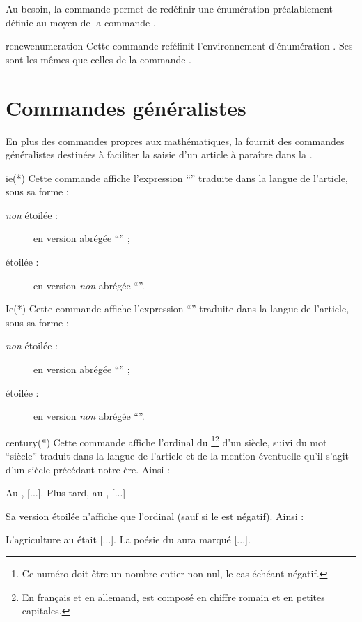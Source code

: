 \documentclass[french,nolocaltoc]{nwejmart}
\newtheorem[style=definition]{fait}
\newtheorem[title=contraventionnalisation]{ctrv}
\newtheorem[title-plural=anneaux]{anneau}
\newtheorem[title-plural=idéaux]{idéal}
\begin{document}
Au besoin, la commande  permet de redéfinir une
énumération préalablement définie au moyen de la commande
.

\begin{docCommand}[doc new=2019-03-18]{renewenumeration}{}
  Cette commande reféfinit l'environnement d'énumération . Ses
   sont les mêmes que celles de la commande
  .
\end{docCommand}

\section{Commandes généralistes}
\label{sec:comm-gener}

En plus des commandes propres aux mathématiques, la \nwejmauthorcl{} fournit des
commandes généralistes destinées à faciliter la saisie d'un article à paraître
dans la \nwejm{}.

\begin{docCommand}{ie(*)}{}
  Cette commande affiche l'expression \enquote{\ie*{}} traduite dans la langue
  de l'article, sous sa forme :
  \begin{description}
  \item[\emph{non} étoilée :] en version abrégée \enquote{\ie{}} ;
  \item[étoilée :] en version \emph{non} abrégée \enquote{\ie*{}}.
  \end{description}
\end{docCommand}

\begin{docCommand}{Ie(*)}{}
  Cette commande affiche l'expression \enquote{\Ie*{}} traduite dans la langue
  de l'article, sous sa forme :
  \begin{description}
  \item[\emph{non} étoilée :] en version abrégée \enquote{\Ie{}} ;
  \item[étoilée :] en version \emph{non} abrégée \enquote{\Ie*{}}.
  \end{description}
\end{docCommand}

\begin{docCommand}{century(*)}{}
  Cette commande affiche l'ordinal du \footnote{Ce numéro doit être
    un nombre entier non nul, le cas échéant négatif.}\footnote{En français et en
    allemand,  est composé en chiffre romain et en petites
    capitales.} d'un siècle, suivi du mot \enquote{siècle} traduit dans la
  langue de l'article et de la mention éventuelle qu'il s'agit d'un siècle
  précédant notre ère. Ainsi :
\begin{bodycode}
Au , [...]. Plus tard, au , [...]
\end{bodycode}
  Sa version étoilée n'affiche que l'ordinal (sauf si le  est
  négatif). Ainsi :
\begin{bodycode}
L'agriculture au  était [...].
La poésie du  aura marqué [...].
\end{bodycode}
\end{docCommand}
\end{document}

